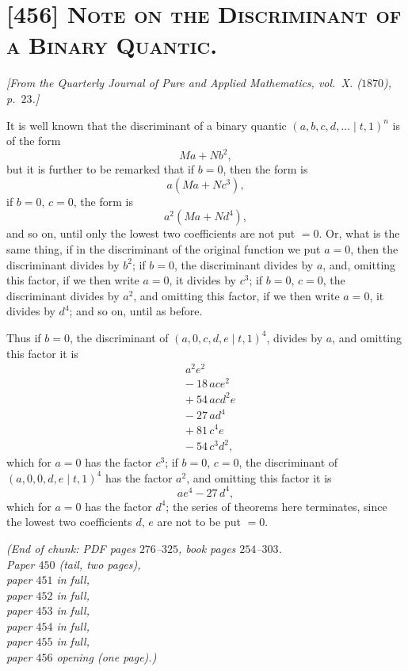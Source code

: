 \documentclass[11pt,a4paper]{article}
\begin{document}
\section*{[456] \textsc{Note on the Discriminant of a Binary Quantic.}}

\begin{center}
\textit{[From the Quarterly Journal of Pure and Applied Mathematics,
vol.\ X. ($1870$), p.~$23$.]}
\end{center}

\medskip

It is well known that the discriminant of a binary quantic
$(a, b, c, d, \dotsc \!\mid\! t, 1)^n$ is of the form
\[
M a + N b^2,
\]
but it is further to be remarked that if $b = 0$, then the form is
\[
a (M a + N c^3),
\]
if $b = 0$, $c = 0$, the form is
\[
a^2 (M a + N d^4),
\]
and so on, until only the lowest two coefficients are not put $= 0$. Or,
what is the same thing, if in the discriminant of the original function
we put $a = 0$, then the discriminant divides by $b^2$; if $b = 0$, the
discriminant divides by $a$, and, omitting this factor, if we then write
$a = 0$, it divides by $c^3$; if $b = 0$, $c = 0$, the discriminant
divides by $a^2$, and omitting this factor, if we then write $a = 0$, it
divides by $d^4$; and so on, until as before.

Thus if $b = 0$, the discriminant of $(a, 0, c, d, e\!\mid\! t, 1)^4$,
divides by $a$, and omitting this factor it is
\[
\begin{aligned}
& a^2 e^2 \\
& -\ 18\, a c e^2 \\
& +\ 54\, a c d^2 e \\
& -\ 27\, a d^4 \\
& +\ 81\, c^4 e \\
& -\ 54\, c^3 d^2,
\end{aligned}
\]
which for $a = 0$ has the factor $c^3$; if $b = 0$, $c = 0$, the
discriminant of $(a, 0, 0, d, e\!\mid\! t, 1)^4$ has the factor $a^2$,
and omitting this factor it is
\[
a e^4 - 27\, d^4,
\]
which for $a = 0$ has the factor $d^4$; the series of theorems here
terminates, since the lowest two coefficients $d$, $e$ are not to be put
$= 0$.

\medskip

\noindent\textit{(End of chunk: PDF pages $276$--$325$, book pages
$254$--$303$.\\
Paper $450$ (tail, two pages),\\
paper $451$ in full,\\
paper $452$ in full,\\
paper $453$ in full,\\
paper $454$ in full,\\
paper $455$ in full,\\
paper $456$ opening (one page).)}
\end{document}

